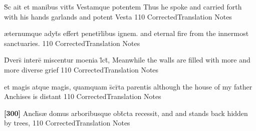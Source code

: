\latline
  {S\={\macron {\i}}c ait et manibus vitt\={}s Vestamque potentem}
  { Thus he spoke and carried forth with his hands garlands and potent Vesta }
  {110}
  { CorrectedTranslation }
  { Notes }


\latline
  {{\ae}ternumque adyt\={\macron {\i}}s effert penetr\={}libus ignem.}
  { and eternal fire from the innermost sanctuaries. }
  {110}
  { CorrectedTranslation }
  { Notes }


\latline
  {D\={\macron {\i}}vers\={} intere\={} miscentur moenia l\={}ct\={},}
  { Meanwhile the walls are filled with more and more diverse grief }
  {110}
  { CorrectedTranslation }
  { Notes }


\latline
  {et magis atque magis, quamquam s\={}cr\={}ta parentis}
  { although the house of my father Anchises is distant }
  {110}
  { CorrectedTranslation }
  { Notes }


\latline
  {\textbf{[300]} Anch\={\macron {\i}}s{\ae} domus arboribusque obt\={}cta recessit,}
  { and and stands back hidden by trees, }
  {110}
  { CorrectedTranslation }
  { Notes }


